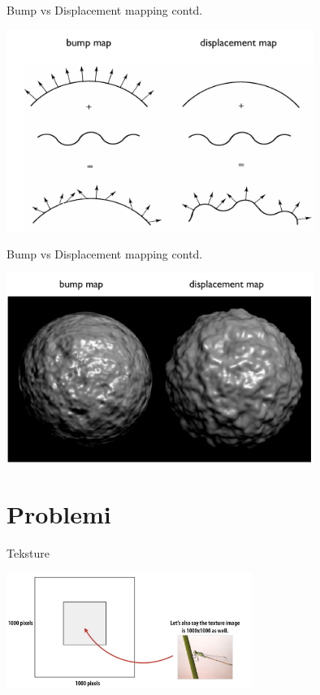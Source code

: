 \documentclass[9pt]{beamer}
\begin{document}
%
\begin{frame}{Bump vs Displacement mapping contd.}
	\begin{center}
		\includegraphics[width=10cm]{slike/03_bump_vs_displacement_mapping.png}
	\end{center}
\end{frame}

\begin{frame}{Bump vs Displacement mapping contd.}
	\begin{center}
		\includegraphics[width=10cm]{slike/03_bump_vs_displacement_mapping_a.png}
	\end{center}
\end{frame}
\section{Problemi}
\begin{frame}{Teksture}
	\begin{center}
		\includegraphics[width=8cm]{./slike/slide_050.jpg}
	\end{center}
\end{frame}
\end{document}
